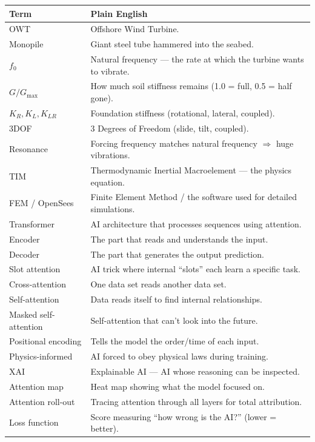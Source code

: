 \documentclass[11pt,a4paper]{article}
\begin{document}
\begin{center}
\small
\begin{tabular}{lp{9.5cm}}
\toprule
\textbf{Term} & \textbf{Plain English} \\
\midrule
OWT & Offshore Wind Turbine. \\
Monopile & Giant steel tube hammered into the seabed. \\
$f_0$ & Natural frequency --- the rate at which the turbine wants to vibrate. \\
$G/G_{\max}$ & How much soil stiffness remains (1.0 = full, 0.5 = half gone). \\
$K_R, K_L, K_{LR}$ & Foundation stiffness (rotational, lateral, coupled). \\
3DOF & 3 Degrees of Freedom (slide, tilt, coupled). \\
Resonance & Forcing frequency matches natural frequency $\Rightarrow$ huge vibrations. \\
TIM & Thermodynamic Inertial Macroelement --- the physics equation. \\
FEM / OpenSees & Finite Element Method / the software used for detailed simulations. \\
Transformer & AI architecture that processes sequences using attention. \\
Encoder & The part that reads and understands the input. \\
Decoder & The part that generates the output prediction. \\
Slot attention & AI trick where internal ``slots'' each learn a specific task. \\
Cross-attention & One data set reads another data set. \\
Self-attention & Data reads itself to find internal relationships. \\
Masked self-attention & Self-attention that can't look into the future. \\
Positional encoding & Tells the model the order/time of each input. \\
Physics-informed & AI forced to obey physical laws during training. \\
XAI & Explainable AI --- AI whose reasoning can be inspected. \\
Attention map & Heat map showing what the model focused on. \\
Attention roll-out & Tracing attention through all layers for total attribution. \\
Loss function & Score measuring ``how wrong is the AI?'' (lower = better). \\

\end{tabular}
\end{center}
\end{document}
